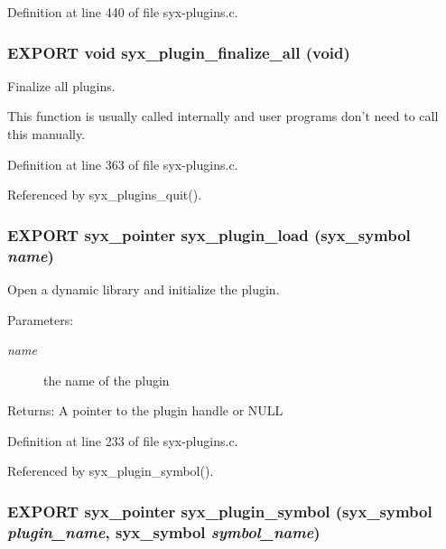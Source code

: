 Definition at line 440 of file syx-plugins.c.\hypertarget{syx-plugins_8h_254fac7eb85ca2c9c2d5158237afb585}{
\subsubsection{\setlength{\rightskip}{0pt plus 5cm}EXPORT void syx\_\-plugin\_\-finalize\_\-all (void)}}
\label{syx-plugins_8h_254fac7eb85ca2c9c2d5158237afb585}


Finalize all plugins.

This function is usually called internally and user programs don't need to call this manually. 

Definition at line 363 of file syx-plugins.c.

Referenced by syx\_\-plugins\_\-quit().\hypertarget{syx-plugins_8h_6bbfab98888c3c4094f8c686971df84f}{
\subsubsection{\setlength{\rightskip}{0pt plus 5cm}EXPORT {\bf syx\_\-pointer} syx\_\-plugin\_\-load ({\bf syx\_\-symbol} {\em name})}}
\label{syx-plugins_8h_6bbfab98888c3c4094f8c686971df84f}


Open a dynamic library and initialize the plugin.

\begin{Desc}
\item[Parameters:]
\begin{description}
\item[{\em name}]the name of the plugin \end{description}
\end{Desc}
\begin{Desc}
\item[Returns:]A pointer to the plugin handle or NULL \end{Desc}


Definition at line 233 of file syx-plugins.c.

Referenced by syx\_\-plugin\_\-symbol().\hypertarget{syx-plugins_8h_5b073fb9cec1768d2c51bf5b82775da6}{
\subsubsection{\setlength{\rightskip}{0pt plus 5cm}EXPORT {\bf syx\_\-pointer} syx\_\-plugin\_\-symbol ({\bf syx\_\-symbol} {\em plugin\_\-name}, \/  {\bf syx\_\-symbol} {\em symbol\_\-name})}}
\label{syx-plugins_8h_5b073fb9cec1768d2c51bf5b82775da6}


